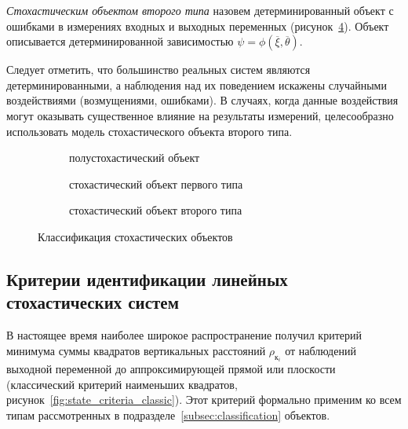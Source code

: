 \emph{Стохастическим объектом второго типа} назовем детерминированный объект с ошибками
в измерениях входных и выходных переменных (рисунок~\ref{fig:type_second}).
Объект описывается детерминированной зависимостью \( \psi = \phi(\overline{\xi}, \overline{\theta}) \).

Следует отметить, что большинство реальных систем являются детерминированными,
а наблюдения над их поведением искажены случайными воздействиями (возмущениями, ошибками).
В случаях, когда данные воздействия могут оказывать существенное влияние на результаты измерений,
целесообразно использовать модель стохастического объекта второго типа.

\begin{figure}[p]
  \begin{subfigure}[b]{\linewidth}
    \centering
    \caption{полустохастический объект}\label{fig:type_half}
  \end{subfigure}

  \vspace{2\baselineskip}
  \begin{subfigure}[b]{\linewidth}
    \centering
    \caption{стохастический объект первого типа}\label{fig:type_first}
  \end{subfigure}

  \vspace{2\baselineskip}
  \begin{subfigure}[b]{\linewidth}
    \centering
    \caption{стохастический объект второго типа}\label{fig:type_second}
  \end{subfigure}

  \vspace{\baselineskip}
  \caption{Классификация стохастических объектов}
\end{figure}

\subsection{Критерии идентификации линейных стохастических систем}\label{ssec:state_criterion}

В настоящее время наиболее широкое распространение получил критерий
минимума суммы квадратов вертикальных расстояний \( \rho_{\text{к}_i} \)
от наблюдений выходной переменной до аппроксимирующей прямой или плоскости
(классический критерий наименьших квадратов, рисунок~\ref{fig:state_criteria_classic}).
Этот критерий формально применим ко всем типам рассмотренных в
подразделе~\ref{subsec:classification} объектов.


